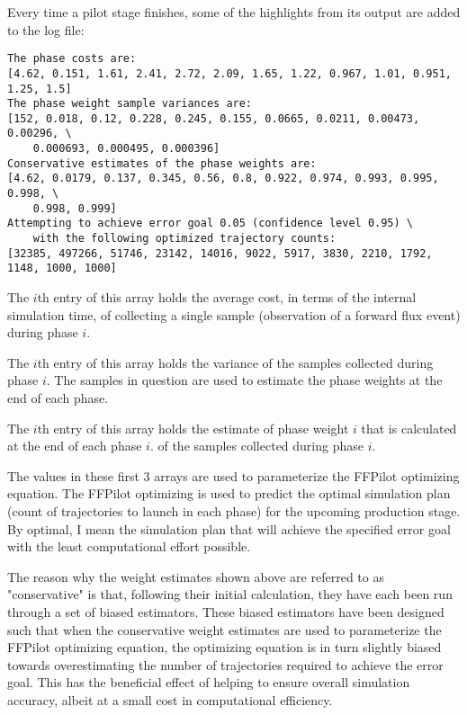 {Every time a pilot stage finishes, some of the highlights from its output are added to the log file:
\begin{verbatim}
The phase costs are:
[4.62, 0.151, 1.61, 2.41, 2.72, 2.09, 1.65, 1.22, 0.967, 1.01, 0.951, 1.25, 1.5]
The phase weight sample variances are:
[152, 0.018, 0.12, 0.228, 0.245, 0.155, 0.0665, 0.0211, 0.00473, 0.00296, \
    0.000693, 0.000495, 0.000396]
Conservative estimates of the phase weights are:
[4.62, 0.0179, 0.137, 0.345, 0.56, 0.8, 0.922, 0.974, 0.993, 0.995, 0.998, \
    0.998, 0.999]
Attempting to achieve error goal 0.05 (confidence level 0.95) \
    with the following optimized trajectory counts:
[32385, 497266, 51746, 23142, 14016, 9022, 5917, 3830, 2210, 1792, 1148, 1000, 1000]
\end{verbatim}
\begin{description}[style=nextline]
    \item[phase costs] The $i$th entry of this array holds the average cost, in terms of the internal simulation time, of collecting a single sample (\ie observation of a forward flux event) during phase $i$.  
    \item[variances] The $i$th entry of this array holds the variance of the samples collected during phase $i$. The samples in question are used to estimate the phase weights at the end of each phase.
    \item[conservative weight estimates] The $i$th entry of this array holds the estimate of phase weight $i$ that is calculated at the end of each phase $i$.  of the samples collected during phase $i$.
\end{description}

The values in these first 3 arrays are used to parameterize the FFPilot optimizing equation\todo{add ref to my paper in submission}. The FFPilot optimizing is used to predict the optimal simulation plan (\ie count of trajectories to launch in each phase) for the upcoming production stage. By optimal, I mean the simulation plan that will achieve the specified error goal with the least computational effort possible. 

The reason why the weight estimates shown above are referred to as "conservative" is that, following their initial calculation, they have each been run through a set of biased estimators. These biased estimators have been designed such that when the conservative weight estimates are used to parameterize the FFPilot optimizing equation, the optimizing equation is in turn slightly biased towards overestimating the number of trajectories required to achieve the error goal. This has the beneficial effect of helping to ensure overall simulation accuracy, albeit at a small cost in computational efficiency. 

}
